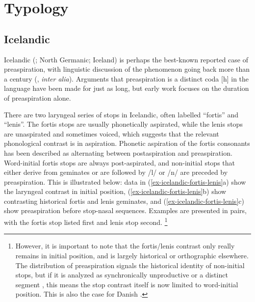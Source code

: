 \documentclass[output=paper,colorlinks,citecolor=brown]{langscibook}
\begin{document}

\section{Typology}
\label{sec-typology}



\subsection{Icelandic}
\label{sec-icelandic}

Icelandic (; North Germanic; Iceland) is perhaps the best-known reported case of preaspiration, with linguistic discussion of the phenomenon going back more than a century (\citealp{sweet1877,ofeigsson1920, malone1923, einarsson1931, einarsson1949, haugen1941, haugen1958, thrainsson1978, arnason1986, arnason2011}, \textit{inter alia}). Arguments that preaspiration is a distinct coda [h] in the language have been made for just as long, but early work focuses on the duration of preaspiration alone. 

There are two laryngeal series of stops in Icelandic, often labelled ``fortis'' and ``lenis''. The fortis stops are usually phonetically aspirated, while the lenis stops are unaspirated and sometimes voiced, which suggests that the relevant phonological contrast is in aspiration. Phonetic aspiration of the fortis consonants has been described as alternating between postaspiration and preaspiration. Word-initial fortis stops are always post-aspirated, and non-initial stops that either derive from geminates or are followed by /l/ or /n/ are preceded by preaspiration. This is illustrated below: data in (\ref{ex-icelandic-fortis-lenis}a) show the laryngeal contrast in initial position, (\ref{ex-icelandic-fortis-lenis}b) show contrasting historical fortis and lenis geminates, and (\ref{ex-icelandic-fortis-lenis}c) show preaspiration before stop-nasal sequences. Examples are presented in pairs, with the fortis stop listed first and lenis stop second.%
\footnote{\label{fn-icelandic-fortis-lenis}However, it is important to note that the fortis/lenis contrast only really remains in initial position, and is largely historical or orthographic elsewhere. The distribution of preaspiration signals the historical identity of non-initial stops, but if it is analyzed as synchronically unproductive or a distinct segment \citep[e.g.,][]{arnason2011}, this means the stop contrast itself is now limited to word-initial position. This is also the case for Danish \citep{basboll2005}.
}
\end{document}
